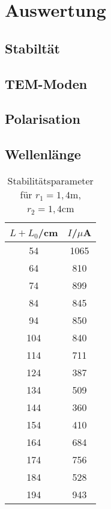\section{Auswertung}
\subsection{Stabiltät}
\subsection{TEM-Moden}
\subsection{Polarisation}
\subsection{Wellenlänge}


\begin{table}[H]
	\begin{center}
		\begin{tabular}{c c}
			\toprule
			\(L+L_0\)/cm & \(I\)/\(\mu\)A \\
			\midrule
			54          &    1065\\
			64            &  810\\
			74             & 899\\
			84              &845\\
			94              &850\\
			104             &840 \\                                                                                    
			114             &711   \\                                                                                  
			124             &387     \\                                                                                
			134             &509       \\                                                                              
			144             &360         \\                                                                            
			154             &410           \\                                                                          
			164             &684             \\                                                                        
			174             &756               \\                                                                      
			184             &528                 \\                                                                    
			194             &943  \\
			\bottomrule
		\end{tabular}
		\caption{Stabilitätsparameter für \(r_1=1,4\text{m}\), \(r_2=1,4\)cm}
		\label{fig:t1}
	\end{center}
\end{table}

